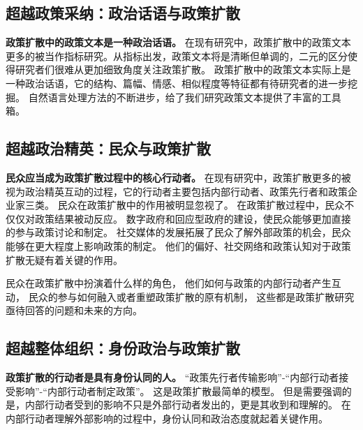 \documentclass[
  12pt,
]{ctexart}
\begin{document}
\hypertarget{ux8d85ux8d8aux653fux7b56ux91c7ux7eb3ux653fux6cbbux8bddux8bedux4e0eux653fux7b56ux6269ux6563}{%
\subsection{超越政策采纳：政治话语与政策扩散}\label{ux8d85ux8d8aux653fux7b56ux91c7ux7eb3ux653fux6cbbux8bddux8bedux4e0eux653fux7b56ux6269ux6563}}

\textbf{政策扩散中的政策文本是一种政治话语。}
在现有研究中，政策扩散中的政策文本更多的被当作指标研究。从指标出发，政策文本将是清晰但单调的，二元的区分使得研究者们很难从更加细致角度关注政策扩散。
政策扩散中的政策文本实际上是一种政治话语，它的结构、篇幅、情感、相似程度等特征都有待研究者的进一步挖掘。
自然语言处理方法的不断进步，给了我们研究政策文本提供了丰富的工具箱。

\hypertarget{ux8d85ux8d8aux653fux6cbbux7cbeux82f1ux6c11ux4f17ux4e0eux653fux7b56ux6269ux6563}{%
\subsection{超越政治精英：民众与政策扩散}\label{ux8d85ux8d8aux653fux6cbbux7cbeux82f1ux6c11ux4f17ux4e0eux653fux7b56ux6269ux6563}}

\textbf{民众应当成为政策扩散过程中的核心行动者。}
在现有研究中，政策扩散更多的被视为政治精英互动的过程，它的行动者主要包括内部行动者、政策先行者和政策企业家三类。
民众在政策扩散中的作用被明显忽视了。
在政策扩散过程中，民众不仅仅对政策结果被动反应。
数字政府和回应型政府的建设，使民众能够更加直接的参与政策讨论和制定。
社交媒体的发展拓展了民众了解外部政策的机会，民众能够在更大程度上影响政策的制定。
他们的偏好、社交网络和政策认知对于政策扩散无疑有着关键的作用。

民众在政策扩散中扮演着什么样的角色，
他们如何与政策的内部行动者产生互动，
民众的参与如何融入或者重塑政策扩散的原有机制，
这些都是政策扩散研究亟待回答的问题和未来的方向。

\hypertarget{ux8d85ux8d8aux6574ux4f53ux7ec4ux7ec7ux8eabux4efdux653fux6cbbux4e0eux653fux7b56ux6269ux6563}{%
\subsection{超越整体组织：身份政治与政策扩散}\label{ux8d85ux8d8aux6574ux4f53ux7ec4ux7ec7ux8eabux4efdux653fux6cbbux4e0eux653fux7b56ux6269ux6563}}

\textbf{政策扩散的行动者是具有身份认同的人。}
``政策先行者传输影响''-``内部行动者接受影响''-``内部行动者制定政策''。
这是政策扩散最简单的模型。
但是需要强调的是，内部行动者受到的影响不只是外部行动者发出的，更是其收到和理解的。
在内部行动者理解外部影响的过程中，身份认同和政治态度就起着关键作用。
\end{document}
